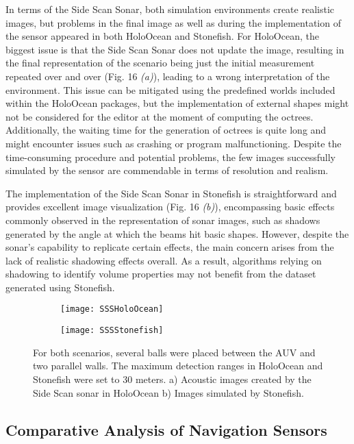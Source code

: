 \documentclass[]{article}
\begin{document}
	In terms of the Side Scan Sonar, both simulation environments create realistic images, but problems in the final image as well as during the implementation of the sensor appeared in both HoloOcean and Stonefish. For HoloOcean, the biggest issue is that the Side Scan Sonar does not update the image, resulting in the final representation of the scenario being just the initial measurement repeated over and over (Fig. 16 \textit{(a)}), leading to a wrong interpretation of the environment. This issue can be mitigated using the predefined worlds included within the HoloOcean packages, but the implementation of external shapes might not be considered for the editor at the moment of computing the octrees. Additionally, the waiting time for the generation of octrees is quite long and might encounter issues such as crashing or program malfunctioning. Despite the time-consuming procedure and potential problems, the few images successfully simulated by the sensor are commendable in terms of resolution and realism.
		
	The implementation of the Side Scan Sonar in Stonefish is straightforward and provides excellent image visualization (Fig. 16 \textit{(b)}), encompassing basic effects commonly observed in the representation of sonar images, such as shadows generated by the angle at which the beams hit basic shapes. However, despite the sonar's capability to replicate certain effects, the main concern arises from the lack of realistic shadowing effects overall. As a result, algorithms relying on shadowing to identify volume properties may not benefit from the dataset generated using Stonefish.
	
	\begin{figure}[H]
		\begin{subfigure}{.5\textwidth}
			\centering
			\texttt{[image: SSSHoloOcean]}
			\caption{}
		\end{subfigure}
		\begin{subfigure}{.5\textwidth}
				\centering
			\texttt{[image: SSSStonefish]}
			\caption{}
		\end{subfigure}
		\caption{For both scenarios, several balls were placed between the AUV and two parallel walls. The maximum detection ranges in HoloOcean and Stonefish were set to 30 meters. a) Acoustic images created by the Side Scan sonar in HoloOcean b) Images simulated by Stonefish.}
	\end{figure}
	
	
	\subsection{Comparative Analysis of Navigation Sensors}
	
\end{document}
